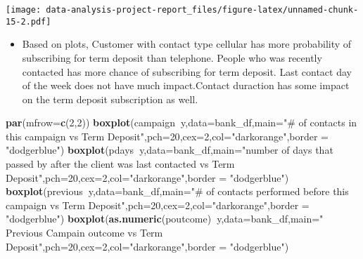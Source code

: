 \documentclass[
]{article}
\newenvironment{Shaded}{\begin{snugshade}}{\end{snugshade}}
\newcommand{\DataTypeTok}[1]{\textcolor[rgb]{0.13,0.29,0.53}{#1}}
\newcommand{\DecValTok}[1]{\textcolor[rgb]{0.00,0.00,0.81}{#1}}
\newcommand{\KeywordTok}[1]{\textcolor[rgb]{0.13,0.29,0.53}{\textbf{#1}}}
\newcommand{\NormalTok}[1]{#1}
\newcommand{\OperatorTok}[1]{\textcolor[rgb]{0.81,0.36,0.00}{\textbf{#1}}}
\newcommand{\StringTok}[1]{\textcolor[rgb]{0.31,0.60,0.02}{#1}}
\providecommand{\tightlist}{%
  \setlength{\itemsep}{0pt}\setlength{\parskip}{0pt}}
\begin{document}
\texttt{[image: data-analysis-project-report\_files/figure-latex/unnamed-chunk-15-2.pdf]}

\begin{itemize}
\tightlist
\item
  Based on plots, Customer with contact type cellular has more
  probability of subscribing for term deposit than telephone. People who
  was recently contacted has more chance of subscribing for term
  deposit. Last contact day of the week does not have much
  impact.Contact duraction has some impact on the term deposit
  subscription as well.
\end{itemize}

\begin{Shaded}
\begin{Highlighting}[]
\KeywordTok{par}\NormalTok{(}\DataTypeTok{mfrow=}\KeywordTok{c}\NormalTok{(}\DecValTok{2}\NormalTok{,}\DecValTok{2}\NormalTok{))}
\KeywordTok{boxplot}\NormalTok{(campaign}\OperatorTok{~}\NormalTok{y,}\DataTypeTok{data=}\NormalTok{bank_df,}\DataTypeTok{main=}\StringTok{"# of contacts in this campaign vs Term Deposit"}\NormalTok{,}\DataTypeTok{pch=}\DecValTok{20}\NormalTok{,}\DataTypeTok{cex=}\DecValTok{2}\NormalTok{,}\DataTypeTok{col=}\StringTok{"darkorange"}\NormalTok{,}\DataTypeTok{border =} \StringTok{"dodgerblue"}\NormalTok{)}
\KeywordTok{boxplot}\NormalTok{(pdays}\OperatorTok{~}\NormalTok{y,}\DataTypeTok{data=}\NormalTok{bank_df,}\DataTypeTok{main=}\StringTok{"number of days that passed by after the client was last contacted vs Term Deposit"}\NormalTok{,}\DataTypeTok{pch=}\DecValTok{20}\NormalTok{,}\DataTypeTok{cex=}\DecValTok{2}\NormalTok{,}\DataTypeTok{col=}\StringTok{"darkorange"}\NormalTok{,}\DataTypeTok{border =} \StringTok{"dodgerblue"}\NormalTok{)}
\KeywordTok{boxplot}\NormalTok{(previous}\OperatorTok{~}\NormalTok{y,}\DataTypeTok{data=}\NormalTok{bank_df,}\DataTypeTok{main=}\StringTok{"# of contacts performed before this campaign vs Term Deposit"}\NormalTok{,}\DataTypeTok{pch=}\DecValTok{20}\NormalTok{,}\DataTypeTok{cex=}\DecValTok{2}\NormalTok{,}\DataTypeTok{col=}\StringTok{"darkorange"}\NormalTok{,}\DataTypeTok{border =} \StringTok{"dodgerblue"}\NormalTok{)}
\KeywordTok{boxplot}\NormalTok{(}\KeywordTok{as.numeric}\NormalTok{(poutcome)}\OperatorTok{~}\NormalTok{y,}\DataTypeTok{data=}\NormalTok{bank_df,}\DataTypeTok{main=}\StringTok{" Previous Campain outcome vs Term Deposit"}\NormalTok{,}\DataTypeTok{pch=}\DecValTok{20}\NormalTok{,}\DataTypeTok{cex=}\DecValTok{2}\NormalTok{,}\DataTypeTok{col=}\StringTok{"darkorange"}\NormalTok{,}\DataTypeTok{border =} \StringTok{"dodgerblue"}\NormalTok{)}
\end{Highlighting}
\end{Shaded}
\end{document}
